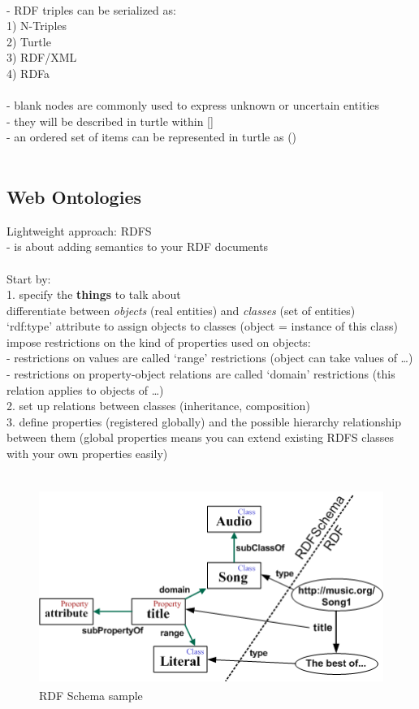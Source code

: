 \\
- RDF triples can be serialized as: \\
    1) N-Triples \\
		2) Turtle \\
		3) RDF/XML \\
		4) RDFa \\
\\
- blank nodes are commonly used to express unknown or uncertain entities \\
- they will be described in turtle within [] \\
- an ordered set of items can be represented in turtle as () \\
\\

\subsection{Web Ontologies}
\label{sec:semantic_ontologies}

Lightweight approach: RDFS \\
- is about adding semantics to your RDF documents \\
\\
Start by: \\
1. specify the \textbf{things} to talk about \\
   differentiate between \textit{objects} (real entities) and \textit{classes} (set of entities) \\
   `rdf:type' attribute to assign objects to classes (object = instance of this class) \\
   impose restrictions on the kind of properties used on objects: \\
   - restrictions on values are called `range' restrictions (object can take values of \ldots) \\
   - restrictions on property-object relations are called `domain' restrictions (this relation applies to objects of \ldots) \\
2. set up relations between classes (inheritance, composition) \\
3. define properties (registered globally) and the possible hierarchy relationship between them (global properties means you can
extend existing RDFS classes with your own properties easily) \\
\\
\begin{figure}[H]
	\centering
		\includegraphics[height=2.5in]{images/RDFSchema.png}
	\caption{RDF Schema sample}
\label{fig:images_rdfs_sample}
\end{figure}

